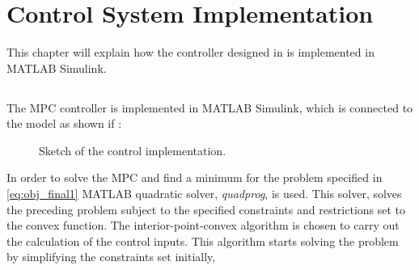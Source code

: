 \chapter{Control System Implementation}
\label{implementation_of_controller}

This chapter will explain how the controller designed in  is implemented in MATLAB Simulink.

\section{}
The MPC controller is implemented in MATLAB Simulink, which is connected to the model as shown if :
\begin{figure}[H]
\centering
 
\caption{Sketch of the control implementation.}
\label{fig:control_sketch}
\end{figure}

In order to solve the MPC and find a minimum for the problem specified in \eqref{eq:obj_final1} MATLAB quadratic solver, \textit{quadprog}, is used. This solver, solves the preceding problem subject to the specified constraints and restrictions set to the convex function. The interior-point-convex algorithm is chosen to carry out the calculation of the control inputs. This algorithm starts solving the problem by simplifying the constraints set initially, 